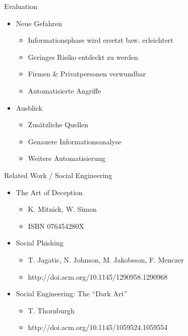 \documentclass[11pt]{beamer}
\begin{document}
\begin{frame}{Evaluation}
  \begin{itemize}
    \item Neue Gefahren
    \begin{itemize}
      \item Informationsphase wird ersetzt bzw. erleichtert
      \item Geringes Risiko entdeckt zu werden
      \item Firmen \& Privatpersonen verwundbar
      \item Automatisierte Angriffe
    \end{itemize}
    \item Ausblick
    \begin{itemize}
      \item Zusätzliche Quellen
      \item Genauere Informationsanalyse
      \item Weitere Automatisierung
    \end{itemize}
  \end{itemize}
\end{frame}

\begin{frame}{Related Work / Social Engineering}
  \begin{itemize}
    \item The Art of Deception
    \begin{itemize}
      \item K. Mitnick, W. Simon
      \item ISBN 076454280X
    \end{itemize}
    \item Social Phishing
    \begin{itemize}
      \item T. Jagatic, N. Johnson, M. Jakobsson, F. Menczer
      \item http://doi.acm.org/10.1145/1290958.1290968
    \end{itemize}
    \item Social Engineering: The “Dark Art”
    \begin{itemize}
      \item T. Thornburgh
      \item http://doi.acm.org/10.1145/1059524.1059554
    \end{itemize}
  \end{itemize}
\end{frame}
\end{document}

